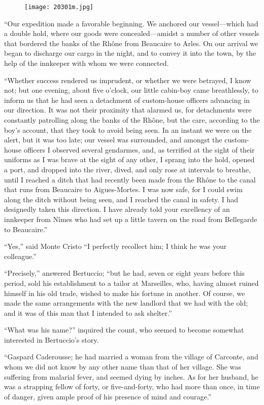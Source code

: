 \begin{figure}[h]
\texttt{[image: 20301m.jpg]}
\end{figure}

“Our expedition made a favorable beginning. We anchored our
vessel—which had a double hold, where our goods were concealed—amidst a
number of other vessels that bordered the banks of the Rhône from
Beaucaire to Arles. On our arrival we began to discharge our cargo in
the night, and to convey it into the town, by the help of the innkeeper
with whom we were connected.

“Whether success rendered us imprudent, or whether we were betrayed, I
know not; but one evening, about five o’clock, our little cabin-boy
came breathlessly, to inform us that he had seen a detachment of
custom-house officers advancing in our direction. It was not their
proximity that alarmed us, for detachments were constantly patrolling
along the banks of the Rhône, but the care, according to the boy’s
account, that they took to avoid being seen. In an instant we were on
the alert, but it was too late; our vessel was surrounded, and amongst
the custom-house officers I observed several gendarmes, and, as
terrified at the sight of their uniforms as I was brave at the sight of
any other, I sprang into the hold, opened a port, and dropped into the
river, dived, and only rose at intervals to breathe, until I reached a
ditch that had recently been made from the Rhône to the canal that runs
from Beaucaire to Aigues-Mortes. I was now safe, for I could swim along
the ditch without being seen, and I reached the canal in safety. I had
designedly taken this direction. I have already told your excellency of
an innkeeper from Nîmes who had set up a little tavern on the road from
Bellegarde to Beaucaire.”

“Yes,” said Monte Cristo “I perfectly recollect him; I think he was
your colleague.”

“Precisely,” answered Bertuccio; “but he had, seven or eight years
before this period, sold his establishment to a tailor at Marseilles,
who, having almost ruined himself in his old trade, wished to make his
fortune in another. Of course, we made the same arrangements with the
new landlord that we had with the old; and it was of this man that I
intended to ask shelter.”

“What was his name?” inquired the count, who seemed to become somewhat
interested in Bertuccio’s story.

“Gaspard Caderousse; he had married a woman from the village of
Carconte, and whom we did not know by any other name than that of her
village. She was suffering from malarial fever, and seemed dying by
inches. As for her husband, he was a strapping fellow of forty, or
five-and-forty, who had more than once, in time of danger, given ample
proof of his presence of mind and courage.”

